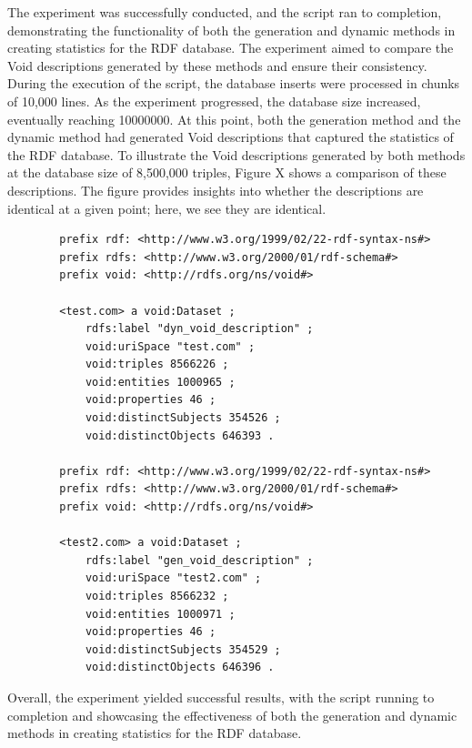 The experiment was successfully conducted, and the script ran to completion, demonstrating the functionality of both the generation and dynamic methods in creating statistics for the RDF database. The experiment aimed to compare the Void descriptions generated by these methods and ensure their consistency.
During the execution of the script, the database inserts were processed in chunks of 10,000 lines. As the experiment progressed, the database size increased, eventually reaching 10000000. At this point, both the generation method and the dynamic method had generated Void descriptions that captured the statistics of the RDF database.
To illustrate the Void descriptions generated by both methods at the database size of 8,500,000 triples, Figure X shows a comparison of these descriptions. The figure provides insights into whether the descriptions are identical at a given point; here, we see they are identical.
\begin{listing}[!ht]
    \begin{verbatim}
        prefix rdf: <http://www.w3.org/1999/02/22-rdf-syntax-ns#>
        prefix rdfs: <http://www.w3.org/2000/01/rdf-schema#>
        prefix void: <http://rdfs.org/ns/void#>
        
        <test.com> a void:Dataset ;
            rdfs:label "dyn_void_description" ;
            void:uriSpace "test.com" ;
            void:triples 8566226 ;
            void:entities 1000965 ;
            void:properties 46 ;
            void:distinctSubjects 354526 ;
            void:distinctObjects 646393 .
        
        prefix rdf: <http://www.w3.org/1999/02/22-rdf-syntax-ns#>
        prefix rdfs: <http://www.w3.org/2000/01/rdf-schema#>
        prefix void: <http://rdfs.org/ns/void#>
        
        <test2.com> a void:Dataset ;
            rdfs:label "gen_void_description" ;
            void:uriSpace "test2.com" ;
            void:triples 8566232 ;
            void:entities 1000971 ;
            void:properties 46 ;
            void:distinctSubjects 354529 ;
            void:distinctObjects 646396 .
    \end{verbatim}
\end{listing}
Overall, the experiment yielded successful results, with the script running to completion and showcasing the effectiveness of both the generation and dynamic methods in creating statistics for the RDF database. 










